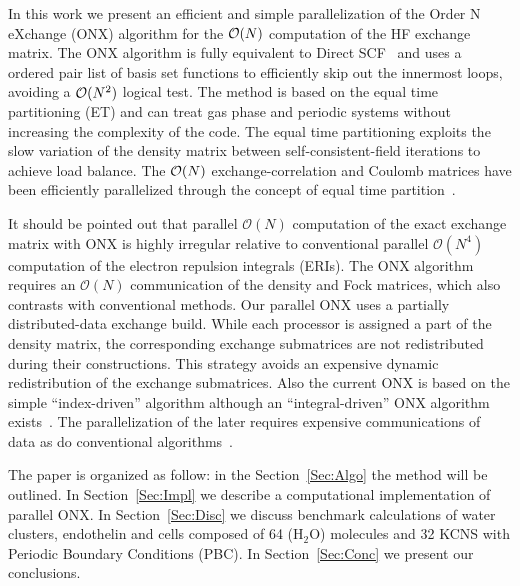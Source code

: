 \documentclass[prl,preprint,doublespace]{revtex4} %
\begin{document}
 In this work we present an efficient and simple parallelization
 of the Order N eXchange (ONX) algorithm for the ${\cal O}(N)$ computation 
 of the HF exchange matrix. The ONX algorithm is fully equivalent to Direct SCF~\cite{Amlof82}
 and uses a ordered pair list of basis set functions to efficiently skip out the innermost loops,
 avoiding a ${\cal O}(N^2)$ logical test.
 The method is based on the equal time partitioning (ET) and can treat gas phase and periodic systems 
 without increasing the complexity of the code. The equal time partitioning exploits 
 the slow variation of the density matrix between self-consistent-field iterations
 to achieve load balance. The ${\cal O}(N)$ exchange-correlation and Coulomb matrices
 have been efficiently parallelized through the concept of equal time
 partition~\cite{CGan03,CGan04B}.

 It should be pointed out that parallel $\mathcal{O}(N)$ computation
 of the exact exchange matrix with ONX is highly irregular relative 
 to conventional parallel $\mathcal{O}(N^4)$ computation of the electron repulsion integrals (ERIs).
 The ONX algorithm requires an $\mathcal{O}(N)$ communication of the 
 density and Fock matrices, which also contrasts with conventional methods.
 Our parallel ONX uses a partially distributed-data exchange build. While each processor 
 is assigned a part of the density matrix, the corresponding exchange submatrices are not redistributed during
 their constructions. This strategy avoids an expensive dynamic redistribution 
 of the exchange submatrices. 
 Also the current ONX is based on the simple ``index-driven'' algorithm although
 an ``integral-driven'' ONX algorithm exists~\cite{ESchwegler00}.
 The parallelization of the later requires expensive communications of data
 as do conventional algorithms~\cite{HTakashima02}.


 The paper is organized as follow: in the Section~\ref{Sec:Algo} the method
 will be outlined.
 In Section~\ref{Sec:Impl} we describe a computational implementation 
 of parallel ONX. In Section~\ref{Sec:Disc} we discuss benchmark calculations of 
 water clusters, endothelin and cells composed of 64
 (H$_2$O) molecules and 32 KCNS with Periodic Boundary Conditions (PBC).    
 In Section~\ref{Sec:Conc} we present our conclusions.


\end{document}
